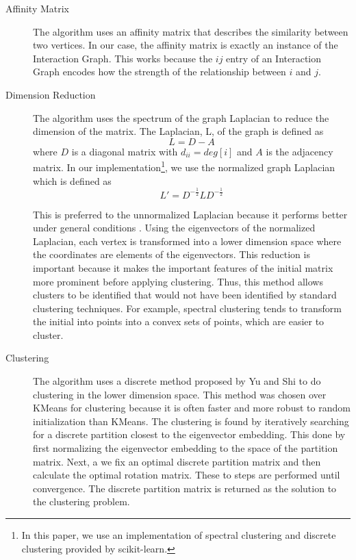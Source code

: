 \begin{description}
  \item[Affinity Matrix] The algorithm uses an affinity matrix that describes the similarity between two vertices. In our case, the affinity matrix is exactly an instance of the Interaction Graph. This works because the $ij$ entry of an Interaction Graph encodes how the strength of the relationship between $i$ and $j$. 
  
  \item[Dimension Reduction] The algorithm uses the spectrum of the graph Laplacian to reduce the dimension of the matrix.  The Laplacian, L, of the graph is defined as 
  \begin{equation}
  L = D - A
  \end{equation}
  where $D$ is a diagonal matrix with $d_{ii} = deg[i]$ and $A$ is the adjacency matrix. In our implementation\footnote{In this paper, we use an implementation of spectral clustering and discrete clustering provided by scikit-learn\cite{spectral}.}, we use the normalized graph Laplacian which is defined as 
  \begin{equation}
  L' = D^{-\frac{1}{2}}LD^{-\frac{1}{2}}
  \end{equation}
  
  This is preferred to the unnormalized Laplacian because it performs better under general conditions \cite{von2008consistency}. Using the eigenvectors of the normalized Laplacian, each vertex is transformed into a lower dimension space where the coordinates are elements of the eigenvectors. This reduction is important because it makes the important features of the initial matrix more prominent before applying clustering. Thus, this method allows clusters to be identified that would not have been identified by standard clustering techniques. For example, spectral clustering tends to transform the initial into points into a convex sets of points, which are easier to cluster\cite{2010PhR...486...75F}.
  
  \item[Clustering] The algorithm uses a discrete method proposed by Yu and Shi to do clustering in the lower dimension space. This method was chosen over KMeans for clustering because it is often faster and more robust to random initialization than KMeans\cite{yu2003multiclass}. The clustering is found by iteratively searching for a discrete partition closest to the eigenvector embedding. This done by first normalizing the eigenvector embedding to the space of the partition matrix. Next, a we fix an optimal discrete partition matrix and then calculate the optimal rotation matrix. These to steps are performed until convergence. The discrete partition matrix is returned as the solution to the clustering problem. 
 
\end{description}

